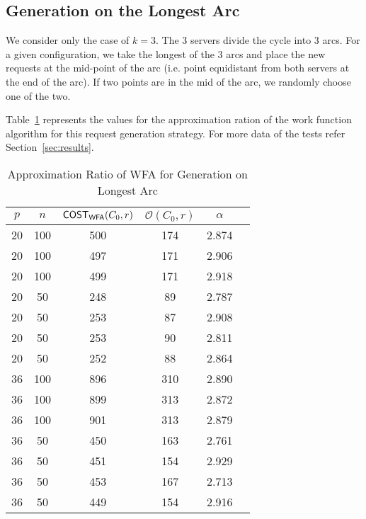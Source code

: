 \subsection{Generation on the Longest Arc}

We consider only the case of $k=3$. The $3$ servers divide the cycle into $3$ arcs. For a given configuration, we take the longest of the $3$ arcs and place the new requests at the mid-point of the arc (i.e. point equidistant from both servers at the end of the arc). If two points are in the mid of the arc, we randomly choose one of the two.

Table~\ref{tab:mid-approx-ratio} represents the values for the approximation ration of the work function algorithm for this request generation strategy. For more data of the tests refer Section~\ref{sec:results}.

\begin{table}[!ht]
\begin{center}
\begin{tabular}{|c|c|c|c|c|c|}
\hline
$p$ & $n$ & $\sf{COST}_{\sf{WFA}} (C_0,r)$ & $\mathcal{O}(C_0,r)$ & $\alpha$ \\
\hline
20 & 100 & 500 & 174 &	2.874   \\
20  & 100 & 497       & 171	& 2.906 \\
20  & 100 & 499       & 171	& 2.918 \\
20  & 50  & 248       & 89	& 2.787  \\
20  & 50  & 253       & 87	& 2.908  \\
20  & 50  & 253       & 90	& 2.811  \\
20  & 50  & 252       & 88	& 2.864  \\
36  & 100 & 896       & 310	& 2.890 \\
36  & 100 & 899       & 313	& 2.872 \\
36  & 100 & 901       & 313	& 2.879 \\
36  & 50  & 450       & 163	& 2.761 \\
36  & 50  & 451       & 154	& 2.929 \\
36  & 50  & 453       & 167	& 2.713 \\
36  & 50  & 449       & 154	& 2.916 \\
\hline
\end{tabular}
\caption{Approximation Ratio of WFA for Generation on Longest Arc}
\label{tab:mid-approx-ratio}
\end{center}
\end{table}

